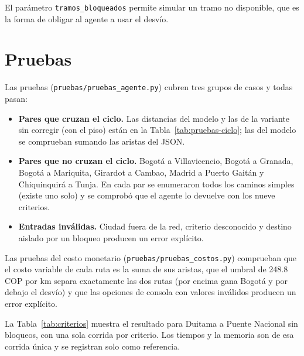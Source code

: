 \documentclass[12pt,a4paper]{article}
\begin{document}
El parámetro \texttt{tramos\_bloqueados} permite simular un tramo no
disponible, que es la forma de obligar al agente a usar el desvío.

\section{Pruebas}

Las pruebas (\texttt{pruebas/pruebas\_agente.py}) cubren tres grupos de casos y
todas pasan:

\begin{itemize}
\item \textbf{Pares que cruzan el ciclo.} Las distancias del modelo y las de la
variante sin corregir (con el piso) están en la
Tabla~\ref{tab:pruebas-ciclo}; las del modelo se comprueban sumando las aristas
del JSON.
\item \textbf{Pares que no cruzan el ciclo.} Bogotá a Villavicencio, Bogotá a
Granada, Bogotá a Mariquita, Girardot a Cambao, Madrid a Puerto Gaitán y
Chiquinquirá a Tunja. En cada par se enumeraron todos los caminos simples
(existe uno solo) y se comprobó que el agente lo devuelve con los nueve
criterios.
\item \textbf{Entradas inválidas.} Ciudad fuera de la red, criterio
desconocido y destino aislado por un bloqueo producen un error explícito.
\end{itemize}

\begin{table}[!htbp]
\centering
\caption{Distancia de las rutas óptimas que cruzan el ciclo, con el modelo y con las distancias sin corregir (con el piso). Fuente: elaboración propia}
\label{tab:pruebas-ciclo}
\footnotesize\setlength{\tabcolsep}{3pt}

\end{table}

Las pruebas del costo monetario (\texttt{pruebas/pruebas\_costos.py}) comprueban
que el costo variable de cada ruta es la suma de sus aristas, que el umbral de
248.8 COP por km separa exactamente las dos rutas (por encima gana Bogotá y
por debajo el desvío) y que las opciones de consola con valores inválidos
producen un error explícito.

La Tabla~\ref{tab:criterios} muestra el resultado para Duitama a Puente
Nacional sin bloqueos, con una sola corrida por criterio. Los tiempos y la
memoria son de esa corrida única y se registran solo como referencia.

\begin{table}[H]
\centering
\caption{Duitama a Puente Nacional según el criterio (una corrida)}
\label{tab:criterios}
\small\setlength{\tabcolsep}{2pt}


\end{table}
\end{document}
